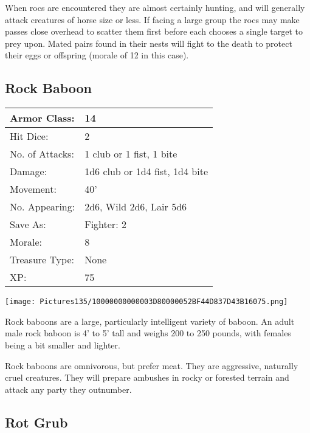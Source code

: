 \documentclass[a4paper,twoside,openany,10pt]{book}
\begin{document}
\begin{multicols}{2}
When rocs are encountered they are almost certainly hunting, and will generally attack creatures of horse size or less. If facing a large group the rocs may make passes close overhead to scatter them first before each chooses a single target to prey upon. Mated pairs found in their nests will fight to the death to protect their eggs or offspring (morale of 12 in this case). 


\subsection*{Rock Baboon}\label{rock-baboon}

\begin{tabularx}{0.50\textwidth}{@{}lX@{}}

Armor Class: & 14 \\\hline
Hit Dice: & 2 \\\hline
No. of Attacks: & 1 club or 1 fist, 1 bite \\\hline
Damage: & 1d6 club or 1d4 fist, 1d4 bite \\\hline
Movement: & 40' \\\hline
No. Appearing: & 2d6, Wild 2d6, Lair 5d6 \\\hline
Save As: & Fighter: 2 \\\hline
Morale: & 8 \\\hline
Treasure Type: & None \\\hline
XP: & 75 \\\hline
\end{tabularx}\medskip

\begin{center} \texttt{[image: Pictures135/10000000000003D80000052BF44D837D43B16075.png]} \end{center}

Rock baboons are a large, particularly intelligent variety of baboon. An adult male rock baboon is 4' to 5' tall and weighs 200 to 250 pounds, with females being a bit smaller and lighter.

Rock baboons are omnivorous, but prefer meat. They are aggressive, naturally cruel creatures. They will prepare ambushes in rocky or forested terrain and attack any party they outnumber.



\subsection*{Rot Grub}\label{rot-grub}


\end{multicols}
\end{document}
